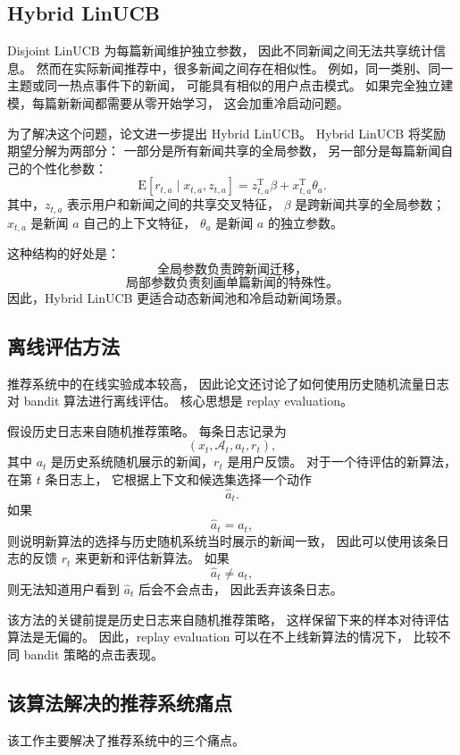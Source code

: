 \documentclass[11pt]{ctexart}
\begin{document}
\subsection{Hybrid LinUCB}

Disjoint LinUCB 为每篇新闻维护独立参数，
因此不同新闻之间无法共享统计信息。
然而在实际新闻推荐中，很多新闻之间存在相似性。
例如，同一类别、同一主题或同一热点事件下的新闻，
可能具有相似的用户点击模式。
如果完全独立建模，每篇新新闻都需要从零开始学习，
这会加重冷启动问题。

为了解决这个问题，论文进一步提出 Hybrid LinUCB。
Hybrid LinUCB 将奖励期望分解为两部分：
一部分是所有新闻共享的全局参数，
另一部分是每篇新闻自己的个性化参数：
\[
\mathrm{E}[r_{t,a}\mid x_{t,a},z_{t,a}]
=
z_{t,a}^{\mathrm{T}}\beta
+
x_{t,a}^{\mathrm{T}}\theta_a.
\]
其中，$z_{t,a}$ 表示用户和新闻之间的共享交叉特征，
$\beta$ 是跨新闻共享的全局参数；
$x_{t,a}$ 是新闻 $a$ 自己的上下文特征，
$\theta_a$ 是新闻 $a$ 的独立参数。

这种结构的好处是：
\[
\text{全局参数负责跨新闻迁移，}
\]
\[
\text{局部参数负责刻画单篇新闻的特殊性。}
\]
因此，Hybrid LinUCB 更适合动态新闻池和冷启动新闻场景。

\subsection{离线评估方法}

推荐系统中的在线实验成本较高，
因此论文还讨论了如何使用历史随机流量日志对 bandit 算法进行离线评估。
核心思想是 replay evaluation。

假设历史日志来自随机推荐策略。
每条日志记录为
\[
(x_t,\mathcal{A}_t,a_t,r_t),
\]
其中 $a_t$ 是历史系统随机展示的新闻，$r_t$ 是用户反馈。
对于一个待评估的新算法，在第 $t$ 条日志上，
它根据上下文和候选集选择一个动作
\[
\hat{a}_t.
\]
如果
\[
\hat{a}_t=a_t,
\]
则说明新算法的选择与历史随机系统当时展示的新闻一致，
因此可以使用该条日志的反馈 $r_t$ 来更新和评估新算法。
如果
\[
\hat{a}_t\neq a_t,
\]
则无法知道用户看到 $\hat{a}_t$ 后会不会点击，
因此丢弃该条日志。

该方法的关键前提是历史日志来自随机推荐策略，
这样保留下来的样本对待评估算法是无偏的。
因此，replay evaluation 可以在不上线新算法的情况下，
比较不同 bandit 策略的点击表现。

\subsection{该算法解决的推荐系统痛点}

该工作主要解决了推荐系统中的三个痛点。
\end{document}
